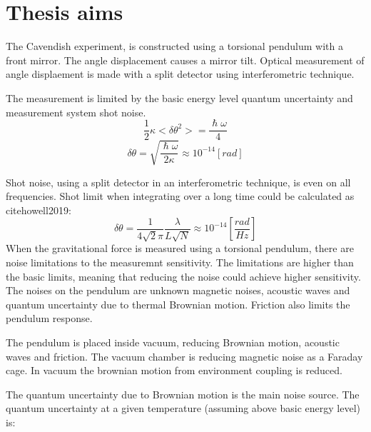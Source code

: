 \documentclass[\main/master.tex]{subfiles}
\begin{document}
\chapter{Thesis aims}\label{chp:Thesis aims}

The Cavendish experiment, is constructed using a torsional pendulum with a front mirror. The angle displacement causes a mirror tilt. Optical measurement of angle displaement is made with a split detector using interferometric technique.
\par\noindent
The measurement is limited by the basic energy level quantum uncertainty and measurement system shot noise.
\begin{equation}
\frac{1}{2}\kappa <\delta\theta^2>= \frac{\hslash\omega}{4}    \label{eqn:basic uncertainty}
\end{equation}
\begin{equation}
\delta\theta= \sqrt{\frac{\hslash\omega}{2\kappa}} \approx 10^{-14} [rad]    \label{eqn:basic uncertainty}
\end{equation}

\noindent
Shot noise, using a split detector in an interferometric technique, is even on all frequencies. Shot limit when integrating over a long time could be calculated as cite{howell2019}:
\begin{equation}
\delta\theta = \frac{1}{4\sqrt{2}\pi}\frac{\lambda}{L\sqrt{N}} \approx
10^{-14} [\frac{rad}{Hz}]    \label{eqn:gravitation_torque}
\end{equation}
When the gravitational force is measured using a torsional pendulum, there are noise limitations to the measuremnt sensitivity. The limitations are higher than the basic limits, meaning that reducing the noise could achieve higher sensitivity. The noises on the pendulum are unknown magnetic noises, acoustic waves and quantum uncertainty due to thermal Brownian motion. Friction also limits the pendulum response. 
\par\noindent
The pendulum is placed inside vacuum, reducing Brownian motion, acoustic waves and friction. The vacuum chamber is reducing magnetic noise as a Faraday cage. In vacuum the brownian motion from environment coupling is reduced.
\par\noindent
The quantum uncertainty due to Brownian motion is the main noise source. The quantum uncertainty at a given temperature (assuming above basic energy level) is:
\end{document}
